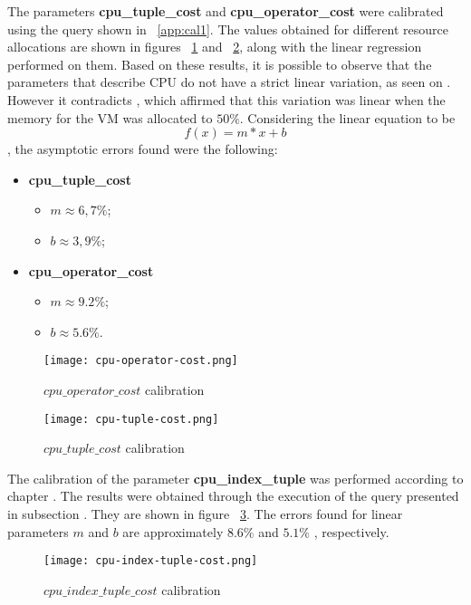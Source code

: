 The parameters \textbf{cpu\_tuple\_cost} and \textbf{cpu\_operator\_cost} were calibrated using the query shown in  ~\ref{app:cal1}. The values obtained for different resource allocations are shown in figures ~\ref{fig:cpuop} and ~\ref{fig:cputp}, along with the linear regression performed on them. Based on these results, it is possible to observe that the parameters that describe CPU do not have a strict linear variation, as seen on  \cite{4401021}. However it contradicts  \cite{Soror:2008:AVM:1376616.1376711}, which affirmed that this variation was linear when the memory for the VM was allocated to $50\%$. Considering the linear equation to be
\[
 f(x) = m*x + b
\],
the asymptotic errors found were the following:
\begin{itemize}
 \item \textbf{cpu\_tuple\_cost}
 \begin{itemize}
  \item $m \approx 6,7\% $;
  \item $b \approx 3,9\% $;
 \end{itemize}
  \item \textbf{cpu\_operator\_cost}
 \begin{itemize}
  \item $m \approx 9.2\% $;
  \item $b \approx 5.6\% $.
 \end{itemize}
\end{itemize}

 
 \begin{figure}[ht]
 \centering
 \texttt{[image: cpu-operator-cost.png]}
 \caption{$cpu\_operator\_cost$ calibration}
 \label{fig:cpuop}
 \end{figure} 
% 
% 
 \begin{figure}[ht]
 \centering
 \texttt{[image: cpu-tuple-cost.png]}
 \caption{$cpu\_tuple\_cost$ calibration}
 \label{fig:cputp}
 \end{figure} 
 
 The calibration of the parameter \textbf{cpu\_index\_tuple} was performed according to chapter \label{chap:implementation}. The results were obtained through the execution of the query presented in subsection \label{app:cal2}. They are shown in figure ~\ref{fig:cpuip}. The errors found for linear parameters $m$ and $b$ are approximately $8.6\%$ and $5.1\%$ , respectively.

 \begin{figure}[ht]
 \centering
 \texttt{[image: cpu-index-tuple-cost.png]}
 \caption{$cpu\_index\_tuple\_cost$ calibration}
 \label{fig:cpuip}
 \end{figure} 
 
